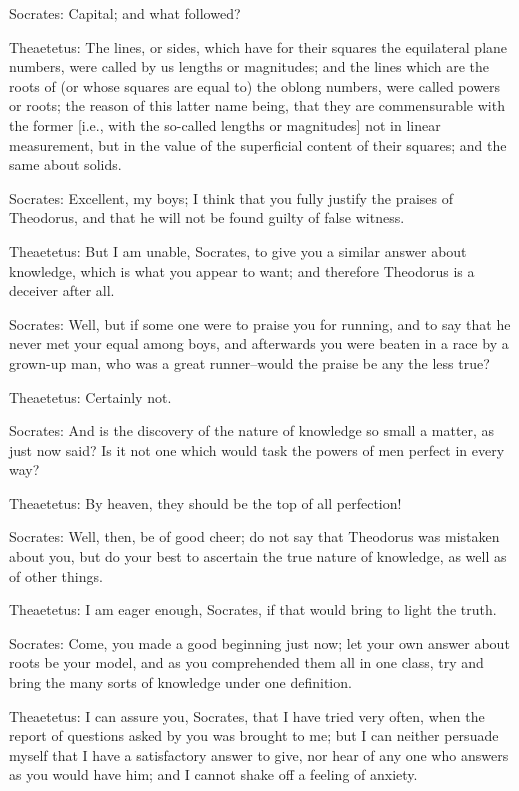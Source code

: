 Socrates: Capital; and what followed?

Theaetetus: The lines, or sides, which have for their squares the
equilateral plane numbers, were called by us lengths or magnitudes; and
the lines which are the roots of (or whose squares are equal to) the
oblong numbers, were called powers or roots; the reason of this latter
name being, that they are commensurable with the former [i.e., with the
so-called lengths or magnitudes] not in linear measurement, but in the
value of the superficial content of their squares; and the same about
solids.

Socrates: Excellent, my boys; I think that you fully justify the praises
of Theodorus, and that he will not be found guilty of false witness.

Theaetetus: But I am unable, Socrates, to give you a similar answer
about knowledge, which is what you appear to want; and therefore
Theodorus is a deceiver after all.

Socrates: Well, but if some one were to praise you for running, and to
say that he never met your equal among boys, and afterwards you were
beaten in a race by a grown-up man, who was a great runner--would the
praise be any the less true?

Theaetetus: Certainly not.

Socrates: And is the discovery of the nature of knowledge so small a
matter, as just now said? Is it not one which would task the powers of
men perfect in every way?

Theaetetus: By heaven, they should be the top of all perfection!

Socrates: Well, then, be of good cheer; do not say that Theodorus was
mistaken about you, but do your best to ascertain the true nature of
knowledge, as well as of other things.

Theaetetus: I am eager enough, Socrates, if that would bring to light
the truth.

Socrates: Come, you made a good beginning just now; let your own answer
about roots be your model, and as you comprehended them all in one
class, try and bring the many sorts of knowledge under one definition.

Theaetetus: I can assure you, Socrates, that I have tried very often,
when the report of questions asked by you was brought to me; but I can
neither persuade myself that I have a satisfactory answer to give, nor
hear of any one who answers as you would have him; and I cannot shake
off a feeling of anxiety.

